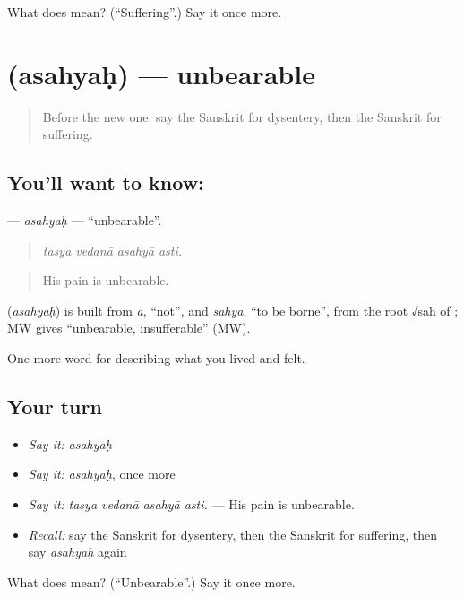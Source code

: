 \begin{tcolorbox}[breakable,colback=teal!4,colframe=teal!35!black,title={Before you move on}]
What does  mean? (\textquotedblleft{}Suffering\textquotedblright{}.) Say it once more.
\end{tcolorbox}
\section[\texorpdfstring{\sk{असह्यः} (asahyaḥ)}{असह्यः (asahyaḥ)}]{ (asahyaḥ) — unbearable}

\label{lesson:SA-C478-asahyah}



\begin{quote}
Before the new one: say the Sanskrit for dysentery, then the Sanskrit for suffering.
\end{quote}

\subsection*{You'll want to know: }
\textbf{} — \emph{asahyaḥ} — \textquotedblleft{}unbearable\textquotedblright{}.

\begin{quote}
   
\end{quote}

\begin{quote}
\emph{tasya vedanā asahyā asti.}
\end{quote}

\begin{quote}
His pain is unbearable.
\end{quote}

\begin{cousinweb}
\textbf{} (\emph{asahyaḥ}) is built from \emph{a}, \textquotedblleft{}not\textquotedblright{}, and \emph{sahya}, \textquotedblleft{}to be borne\textquotedblright{}, from the root √sah of \textbf{}; MW gives \textquotedblleft{}unbearable, insufferable\textquotedblright{} (MW).
\end{cousinweb}

\begin{grammarlens}[title={What you've built}]
One more word for describing what you lived and felt.
\end{grammarlens}

\subsection*{Your turn}
\begin{itemize}
\raggedright
  \item \emph{Say it:} \emph{asahyaḥ}
  \item \emph{Say it:} \emph{asahyaḥ}, once more
  \item \emph{Say it:} \emph{tasya vedanā asahyā asti.} — His pain is unbearable.
  \item \emph{Recall:} say the Sanskrit for dysentery, then the Sanskrit for suffering, then say \emph{asahyaḥ} again
\end{itemize}

\begin{tcolorbox}[breakable,colback=teal!4,colframe=teal!35!black,title={Before you move on}]
What does  mean? (\textquotedblleft{}Unbearable\textquotedblright{}.) Say it once more.
\end{tcolorbox}
